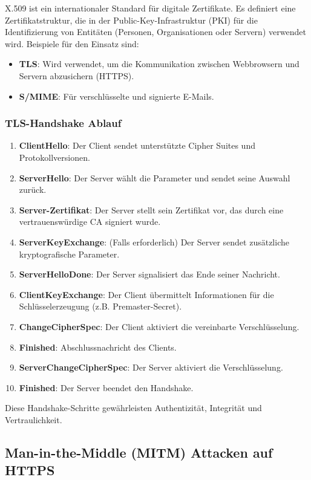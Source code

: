 \documentclass{article}
\begin{document}
X.509 ist ein internationaler Standard für digitale Zertifikate. Es definiert eine Zertifikatstruktur, die in der Public-Key-Infrastruktur (PKI) für die Identifizierung von Entitäten (Personen, Organisationen oder Servern) verwendet wird. Beispiele für den Einsatz sind:

\begin{itemize}
  \item \textbf{TLS}: Wird verwendet, um die Kommunikation zwischen Webbrowsern und Servern abzusichern (HTTPS).
  \item \textbf{S/MIME}: Für verschlüsselte und signierte E-Mails.
\end{itemize}

\subsubsection{TLS-Handshake Ablauf}
\begin{enumerate}
  \item \textbf{ClientHello}: Der Client sendet unterstützte Cipher Suites und Protokollversionen.
  \item \textbf{ServerHello}: Der Server wählt die Parameter und sendet seine Auswahl zurück.
  \item \textbf{Server-Zertifikat}: Der Server stellt sein Zertifikat vor, das durch eine vertrauenswürdige CA signiert wurde.
  \item \textbf{ServerKeyExchange}: (Falls erforderlich) Der Server sendet zusätzliche kryptografische Parameter.
  \item \textbf{ServerHelloDone}: Der Server signalisiert das Ende seiner Nachricht.
  \item \textbf{ClientKeyExchange}: Der Client übermittelt Informationen für die Schlüsselerzeugung (z.B. Premaster-Secret).
  \item \textbf{ChangeCipherSpec}: Der Client aktiviert die vereinbarte Verschlüsselung.
  \item \textbf{Finished}: Abschlussnachricht des Clients.
  \item \textbf{ServerChangeCipherSpec}: Der Server aktiviert die Verschlüsselung.
  \item \textbf{Finished}: Der Server beendet den Handshake.
\end{enumerate}

Diese Handshake-Schritte gewährleisten Authentizität, Integrität und Vertraulichkeit.

\subsection{Man-in-the-Middle (MITM) Attacken auf HTTPS}
\end{document}
